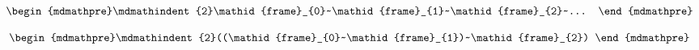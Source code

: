 \documentclass[10pt]{book}
\begin{document}
\begin{mdSnippets}
\begin{mdDisplaySnippet}[536aa87c823ba6ec47a60f59e0d8f641]%
\[%
\begin{mdmathpre}%
\mdmathindent{2}\mathid{frame}_{0}~\mathid{frame}_{1}~\mathid{frame}_{2}~...
\end{mdmathpre}%
\]%
\end{mdDisplaySnippet}%
\begin{mdDisplaySnippet}%
\[%
\begin{mdmathpre}%
\mdmathindent{2}((\mathid{frame}_{0}~\mathid{frame}_{1})~\mathid{frame}_{2})
\end{mdmathpre}%
\]%
\end{mdDisplaySnippet}%

\end{mdSnippets}
\end{document}
